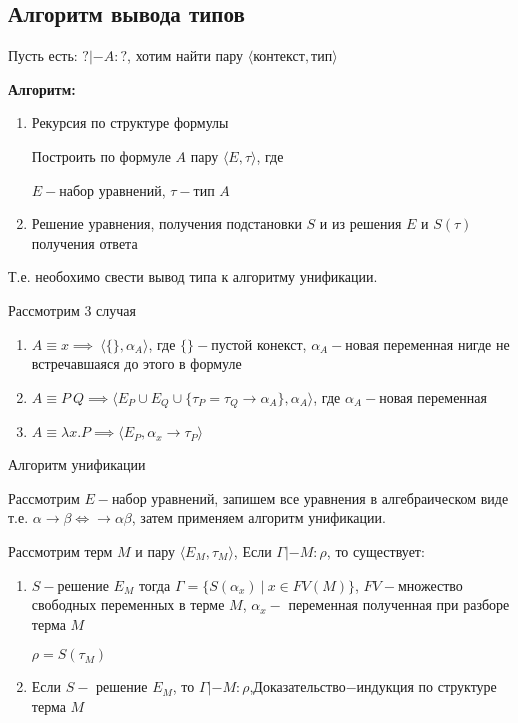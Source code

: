 \documentclass[12pt, a4paper]{article}
\begin{document}
		\subsection{Алгоритм вывода типов}
			Пусть есть: $?|-A:?$, хотим найти пару $\big \langle \text{контекст}, \text{тип} \big \rangle$\par
	\textbf{Алгоритм:}
	\begin{enumerate}
		\item Рекурсия по структуре формулы\par Построить по формуле $A$ пару $\big \langle E, \tau\big \rangle$, где\par $E-$набор уравнений, $\tau-$тип $A$
		\item Решение уравнения, получения подстановки $S$ и из решения $E$ и $S(\tau)$ получения ответа	
	\end{enumerate}
		Т.е. необохимо свести вывод типа к алгоритму унификации.\par
		\begin{oun_paragraph}Рассмотрим 3 случая\end{oun_paragraph}
			\begin{enumerate}
				\item $A\equiv x\implies\:\big \langle \{\}, \alpha_A\big\rangle$, где $\{\}-$пустой конекст, $\alpha_A-$новая переменная нигде не встречавшаяся до этого в формуле
				\item $A\equiv P\:Q\implies\big \langle E_P\cup E_Q\cup \{\tau_P=\tau_Q\rightarrow\alpha_A\}, \alpha_A\big \rangle$, где $\alpha_A-$новая переменная
				\item $A\equiv\lambda x.P\implies\big\langle E_P,\alpha_x\rightarrow\tau_P\big\rangle$
			\end{enumerate}
		\begin{oun_paragraph}Алгоритм унификации\end{oun_paragraph} 
			Рассмотрим $E-$набор уравнений, запишем все уравнения в алгебраическом виде т.е. $\alpha\rightarrow\beta\Leftrightarrow\rightarrow\alpha\beta$, затем применяем алгоритм унификации.
	\begin{lemma}
	Рассмотрим терм $M$ и пару $\big\langle E_M, \tau_M\big\rangle$, Если $\Gamma|-M:\rho$, то существует:
	\end{lemma}	
		\begin{enumerate}
		\item $S-$решение $E_M$ тогда $\Gamma=\{S(\alpha_x)\:|\:x\in FV(M)\}$, $FV-$множество свободных переменных в терме $M$, $\alpha_x-$ переменная полученная при разборе терма $M$\par
		$\rho=S(\tau_M)$
		\item Если $S-$ решение $E_M$, то $\Gamma|-M:\rho$,Доказательство$-$индукция по структуре терма $M$
	\end{enumerate}				
\end{document}

